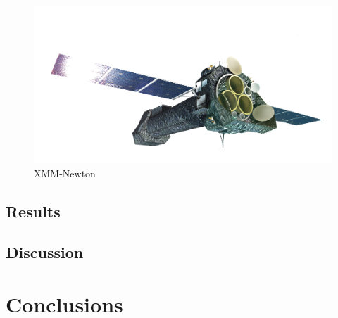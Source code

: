 \documentclass[oneside,a4paper,11pt]{report}
\begin{document}
\begin{figure}[!hbt]
\centering
\includegraphics[totalheight=6cm]{XMM}
\caption{XMM-Newton }
\label{microblazar} 
\end{figure}


\section{Results}
\section{Discussion}
\chapter{Conclusions}



\end{document}
